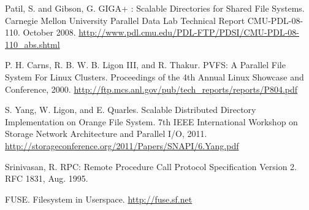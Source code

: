 \documentclass[twocolumn,letterpaper]{article}
\begin{document}
\begin{thebibliography}{9}

    Patil, S. and Gibson, G. GIGA+ : Scalable Directories for Shared File Systems.
    Carnegie Mellon University Parallel Data Lab Technical Report CMU-PDL-08-110.
    October 2008.
    \url{http://www.pdl.cmu.edu/PDL-FTP/PDSI/CMU-PDL-08-110_abs.shtml}

    P. H. Carns, R. B. W. B. Ligon III, and R. Thakur. PVFS: A Parallel File
    System For Linux Clusters. Proceedings of the 4th Annual Linux Showcase
    and Conference, 2000.
    \url{http://ftp.mcs.anl.gov/pub/tech_reports/reports/P804.pdf}

    S. Yang, W. Ligon, and E. Quarles. Scalable Distributed Directory
    Implementation on Orange File System. 7th IEEE International Workshop on
    Storage Network Architecture and Parallel I/O, 2011.
    \url{http://storageconference.org/2011/Papers/SNAPI/6.Yang.pdf}

    Srinivasan, R. RPC: Remote Procedure Call Protocol Specification Version 2.
    RFC 1831, Aug. 1995.

    FUSE. Filesystem in Userspace. \url{http://fuse.sf.net}

\end{thebibliography}
\end{document}
